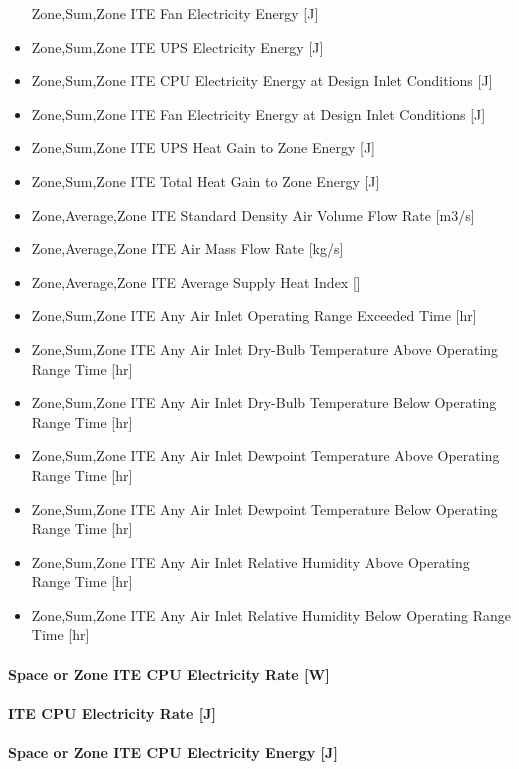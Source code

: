 \begin{itemize}
  Zone,Sum,Zone ITE Fan Electricity Energy {[}J{]}
\item
  Zone,Sum,Zone ITE UPS Electricity Energy {[}J{]}
\item
  Zone,Sum,Zone ITE CPU Electricity Energy at Design Inlet Conditions {[}J{]}
\item
  Zone,Sum,Zone ITE Fan Electricity Energy at Design Inlet Conditions {[}J{]}
\item
  Zone,Sum,Zone ITE UPS Heat Gain to Zone Energy {[}J{]}
\item
  Zone,Sum,Zone ITE Total Heat Gain to Zone Energy {[}J{]}
\item
  Zone,Average,Zone ITE Standard Density Air Volume Flow Rate {[}m3/s{]}
\item
  Zone,Average,Zone ITE Air Mass Flow Rate {[}kg/s{]}
\item
  Zone,Average,Zone ITE Average Supply Heat Index {[]}
\item
  Zone,Sum,Zone ITE Any Air Inlet Operating Range Exceeded Time {[}hr{]}
\item
  Zone,Sum,Zone ITE Any Air Inlet Dry-Bulb Temperature Above Operating Range Time {[}hr{]}
\item
  Zone,Sum,Zone ITE Any Air Inlet Dry-Bulb Temperature Below Operating Range Time {[}hr{]}
\item
  Zone,Sum,Zone ITE Any Air Inlet Dewpoint Temperature Above Operating Range Time {[}hr{]}
\item
  Zone,Sum,Zone ITE Any Air Inlet Dewpoint Temperature Below Operating Range Time {[}hr{]}
\item
  Zone,Sum,Zone ITE Any Air Inlet Relative Humidity Above Operating Range Time {[}hr{]}
\item
  Zone,Sum,Zone ITE Any Air Inlet Relative Humidity Below Operating Range Time {[}hr{]}
\end{itemize}

\paragraph{Space or Zone ITE CPU Electricity Rate {[}W{]}}\label{zone-ite-cpu-electric-power-w}

\paragraph{ITE CPU Electricity Rate {[}J{]}}\label{ite-cpu-electric-rate-w}

\paragraph{Space or Zone ITE CPU Electricity Energy {[}J{]}}\label{zone-ite-cpu-electric-energy-j}

